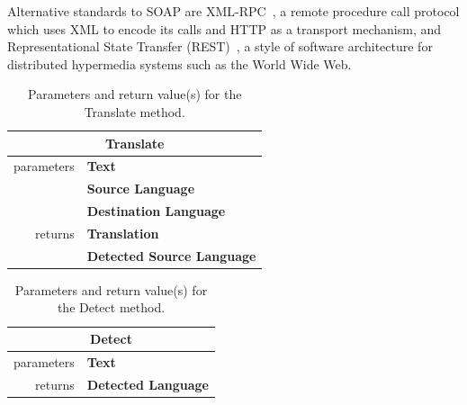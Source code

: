 \documentclass[11pt]{article}
\begin{document}
Alternative standards to SOAP are XML-RPC~\citep{xmlrpcspec}, a remote procedure call protocol which uses XML to encode its calls and HTTP as a transport mechanism, and Representational State Transfer (REST)~\citep{rest}, a style of software architecture for distributed hypermedia systems such as the World Wide Web.

\begin{table}[!ht]
\begin{center}
 \begin{tabular}{|r|l|}
  \hline
  \multicolumn{2}{c}{{\bf Translate}} \\
  \hline \hline
   parameters	& {\bf Text} \\ \cline{2-2}
   				& {\bf Source Language} \\ \cline{2-2}
   				& {\bf Destination Language} \\ %
  \hline \hline
   returns 	& {\bf Translation} \\ \cline{2-2}
   			& {\bf Detected Source Language} \\
  \hline
 \end{tabular}
\end{center}
\caption{Parameters and return value(s) for the Translate method.}
\label{tab:translate}
\end{table}

\begin{table}[!ht]
\begin{center}
 \begin{tabular}{|r|l|}
  \hline
  \multicolumn{2}{c}{{\bf Detect}} \\
  \hline \hline
   parameters	& {\bf Text} \\
  \hline \hline
   returns 	& {\bf Detected Language}\\
  \hline
 \end{tabular}
\end{center}
\caption{Parameters and return value(s) for the Detect method.}
\label{tab:detect}
\end{table}

\end{document}
